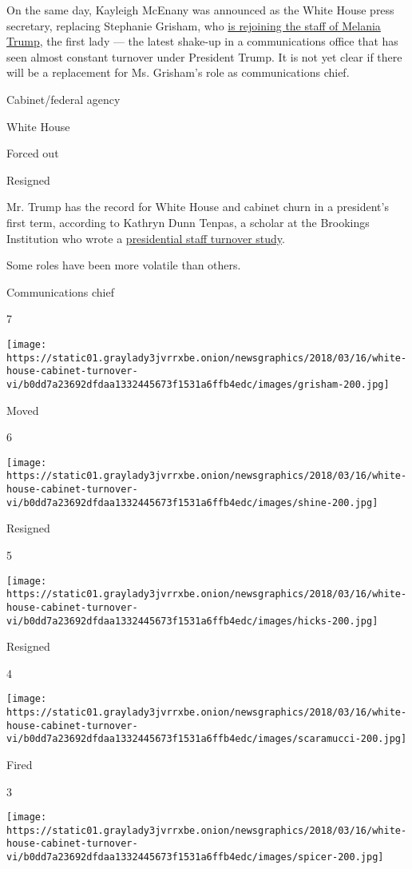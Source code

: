 On the same day, Kayleigh McEnany was announced as the White House press
secretary, replacing Stephanie Grisham, who
\href{https://www.nytimes3xbfgragh.onion/2020/04/07/us/politics/kayleigh-mcenany-stephanie-grisham-trump.html}{is
rejoining the staff of Melania Trump}, the first lady --- the latest
shake-up in a communications office that has seen almost constant
turnover under President Trump. It is not yet clear if there will be a
replacement for Ms. Grisham's role as communications chief.

 Cabinet/federal agency

 White House

 Forced out

 Resigned

Mr. Trump has the record for White House and cabinet churn in a
president's first term, according to Kathryn Dunn Tenpas, a scholar at
the Brookings Institution who wrote a
\href{https://www.brookings.edu/research/tracking-turnover-in-the-trump-administration/}{presidential
staff turnover study}.

Some roles have been more volatile than others.

Communications chief

7

\texttt{[image: https://static01.graylady3jvrrxbe.onion/newsgraphics/2018/03/16/white-house-cabinet-turnover-vi/b0dd7a23692dfdaa1332445673f1531a6ffb4edc/images/grisham-200.jpg]}

Moved

6

\texttt{[image: https://static01.graylady3jvrrxbe.onion/newsgraphics/2018/03/16/white-house-cabinet-turnover-vi/b0dd7a23692dfdaa1332445673f1531a6ffb4edc/images/shine-200.jpg]}

Resigned

5

\texttt{[image: https://static01.graylady3jvrrxbe.onion/newsgraphics/2018/03/16/white-house-cabinet-turnover-vi/b0dd7a23692dfdaa1332445673f1531a6ffb4edc/images/hicks-200.jpg]}

Resigned

4

\texttt{[image: https://static01.graylady3jvrrxbe.onion/newsgraphics/2018/03/16/white-house-cabinet-turnover-vi/b0dd7a23692dfdaa1332445673f1531a6ffb4edc/images/scaramucci-200.jpg]}

Fired

3

\texttt{[image: https://static01.graylady3jvrrxbe.onion/newsgraphics/2018/03/16/white-house-cabinet-turnover-vi/b0dd7a23692dfdaa1332445673f1531a6ffb4edc/images/spicer-200.jpg]}

